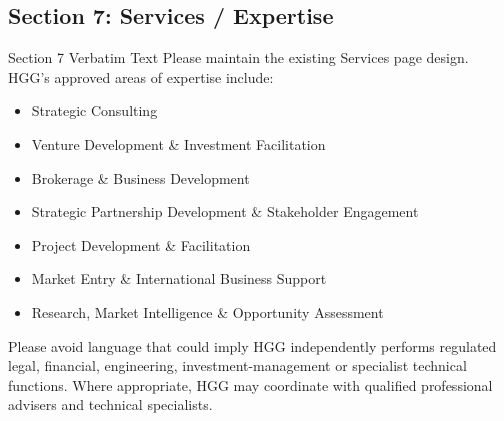 \documentclass[11pt,a4paper]{article}
\begin{document}
\vspace{0.3cm}

\subsection{Section 7: Services / Expertise}

\begin{VerbatimClientBox}{Section 7 Verbatim Text}
Please maintain the existing Services page design.
HGG's approved areas of expertise include:
\begin{itemize}[noitemsep]
    \item Strategic Consulting
    \item Venture Development \& Investment Facilitation
    \item Brokerage \& Business Development
    \item Strategic Partnership Development \& Stakeholder Engagement
    \item Project Development \& Facilitation
    \item Market Entry \& International Business Support
    \item Research, Market Intelligence \& Opportunity Assessment
\end{itemize}
Please avoid language that could imply HGG independently performs regulated legal, financial, engineering, investment-management or specialist technical functions.
Where appropriate, HGG may coordinate with qualified professional advisers and technical specialists.
\end{VerbatimClientBox}
\end{document}
